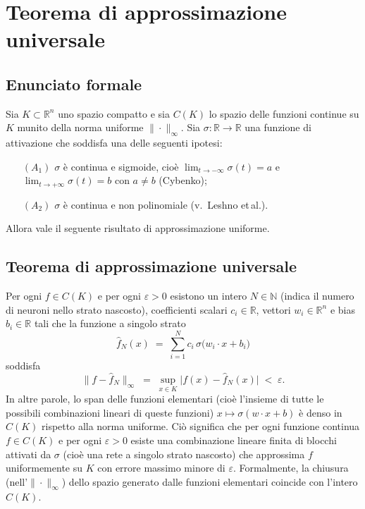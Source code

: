 \documentclass[a4paper,12pt]{report}
\begin{document}
	\section{Teorema di approssimazione universale}
	
	\subsection{Enunciato formale}
	Sia \(K\subset\mathbb{R}^n\) uno spazio compatto e sia \(C(K)\) lo spazio delle funzioni continue su \(K\) munito della norma uniforme \(\|\cdot\|_\infty\). Sia \(\sigma:\mathbb{R}\to\mathbb{R}\) una funzione di attivazione che soddisfa una delle seguenti ipotesi:
	
	\begin{enumerate}
		\item[\((A_1)\)] \(\sigma\) è continua e sigmoide, cioè \(\lim_{t\to -\infty}\sigma(t)=a\) e \(\lim_{t\to +\infty}\sigma(t)=b\) con \(a\neq b\) (Cybenko);
		\item[\((A_2)\)] \(\sigma\) è continua e non polinomiale (v.\ Leshno et\,al.). 
	\end{enumerate}
	
	Allora vale il seguente risultato di approssimazione uniforme.
	
	\subsection{Teorema di approssimazione universale}
	Per ogni \(f\in C(K)\) e per ogni \(\varepsilon>0\) esistono un intero \(N\in\mathbb{N}\) (indica il numero di neuroni nello strato nascosto), coefficienti scalari \(c_i\in\mathbb{R}\), vettori \(w_i\in\mathbb{R}^n\) e bias \(b_i\in\mathbb{R}\) tali che la funzione a singolo strato
	\[
	\hat f_N(x) \;=\; \sum_{i=1}^N c_i\,\sigma\bigl(w_i\cdot x + b_i\bigr)
	\]
	soddisfa
	\[
	\|f - \hat f_N\|_\infty \;=\; \sup_{x\in K} \bigl|f(x)-\hat f_N(x)\bigr| \;<\; \varepsilon.
	\]
	In altre parole, lo span delle funzioni elementari (cioè l'insieme di tutte le possibili combinazioni lineari di queste funzioni) \(x\mapsto\sigma(w\cdot x + b)\) è denso in \(C(K)\) rispetto alla norma uniforme. Ciò significa che per ogni funzione continua \(f\in C(K)\) e per ogni \(\varepsilon>0\) esiste una combinazione lineare finita di blocchi attivati da \(\sigma\) (cioè una rete a singolo strato nascosto) che approssima \(f\) uniformemente su \(K\) con errore massimo minore di \(\varepsilon\). Formalmente, la chiusura (nell'\(\|\cdot\|_\infty\)) dello spazio generato dalle funzioni elementari coincide con l'intero \(C(K)\).
	
\end{document}
